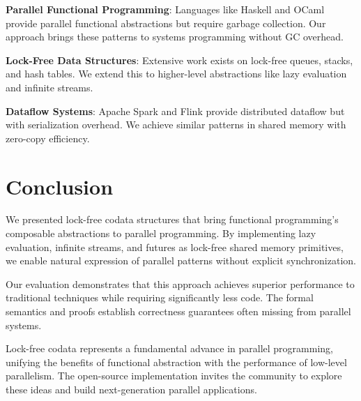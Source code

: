 \documentclass[sigconf,review,anonymous]{acmart}
\begin{document}
\textbf{Parallel Functional Programming}: Languages like Haskell and OCaml provide parallel functional abstractions but require garbage collection. Our approach brings these patterns to systems programming without GC overhead.

\textbf{Lock-Free Data Structures}: Extensive work exists on lock-free queues, stacks, and hash tables. We extend this to higher-level abstractions like lazy evaluation and infinite streams.

\textbf{Dataflow Systems}: Apache Spark and Flink provide distributed dataflow but with serialization overhead. We achieve similar patterns in shared memory with zero-copy efficiency.

\section{Conclusion}

We presented lock-free codata structures that bring functional programming's composable abstractions to parallel programming. By implementing lazy evaluation, infinite streams, and futures as lock-free shared memory primitives, we enable natural expression of parallel patterns without explicit synchronization.

Our evaluation demonstrates that this approach achieves superior performance to traditional techniques while requiring significantly less code. The formal semantics and proofs establish correctness guarantees often missing from parallel systems.

Lock-free codata represents a fundamental advance in parallel programming, unifying the benefits of functional abstraction with the performance of low-level parallelism. The open-source implementation invites the community to explore these ideas and build next-generation parallel applications.



\end{document}
